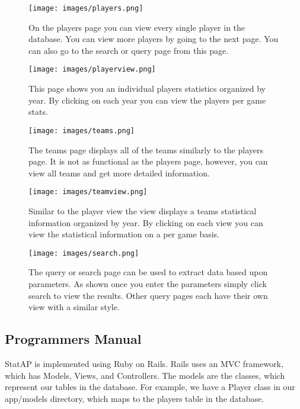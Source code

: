 \documentclass[12pt,letterpaper]{article}
\begin{document}
\begin{figure}
\centering
\texttt{[image: images/players.png]}
\caption{On the players page you can view every single player in the database. You can view more players by going to the next page. You can also go to the search or query page from this page.}
\label{fig:home}
\end{figure}

\begin{figure}
\centering
\texttt{[image: images/playerview.png]}
\caption{This page shows you an individual players statistics organized by year. By clicking on each year you can view the players per game stats. }
\label{fig:home}
\end{figure}

\begin{figure}
\centering
\texttt{[image: images/teams.png]}
\caption{The teams page displays all of the teams similarly to the players page. It is not as functional as the players page, however, you can view all teams and get more detailed information.}
\end{figure}

\begin{figure}
\centering
\texttt{[image: images/teamview.png]}
\caption{Similar to the player view the view displays a teams statistical information organized by year. By clicking on each view you can view the statistical information on a per game basis.}
\label{fig:home}
\end{figure}

\begin{figure}
\centering
\texttt{[image: images/search.png]}
\caption{The query or search page can be used to extract data based upon parameters. As shown once you enter the parameters simply click search to view the results. Other query pages each have their own view with a similar style.}
\label{fig:home}
\end{figure}

\clearpage\null
\subsection{Programmers Manual}

StatAP is implemented using Ruby on Rails. Rails uses an MVC framework,
which has Models, Views, and Controllers. The models are the classes, which
represent our tables in the database. For example, we have a Player class in
our app/models directory, which maps to the players table in the database.\\
\end{document}
